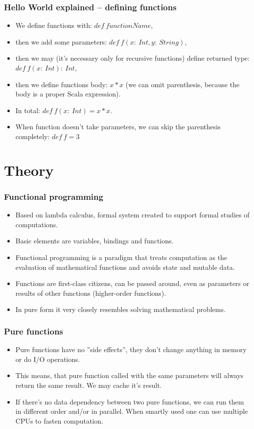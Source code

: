 \documentclass[xcolor=dvipsnames]{beamer}
\begin{document}
\begin{frame}
\frametitle{Hello World explained -- defining functions}
\begin{itemize}
\item We define functions with: $def\:functionName$,
\item then we add some parameters: $def\:f(x:\:Int, y:\:String)$,
\item then we may (it's necessary only for recursive functions) define returned type: $def\:f(x:\:Int):\:Int$,
\item then we define functions body: $x * x$ (we can omit parenthesis, because the body is a proper Scala expression).
\item In total: $def\:f(x:\:Int) = x * x$.
\item When function doesn't take parameters, we can skip the parenthesis completely: $def\:f = 3$
\end{itemize}
\end{frame}


\section{Theory}

\begin{frame}
\frametitle{Functional programming}
\begin{itemize}
\item Based on lambda calculus, formal system created to support formal studies of computations.
\item Basic elements are variables, bindings and functions.
\item Functional programming is a paradigm that treats computation as the evaluation of mathematical functions and avoids state and mutable data.
\item Functions are first-class citizens, can be passed around, even as parameters or results of other functions (higher-order functions).
\item In pure form it very closely resembles solving mathematical problems.
\end{itemize}
\end{frame}

\begin{frame}
\frametitle{Pure functions}
\begin{itemize}
\item Pure functions have no ''side effects'', they don't change anything in memory or do I/O operations.
\item This means, that pure function called with the same parameters will always return the same result. We may cache it's result.
\item If there's no data dependency between two pure functions, we can run them in different order and/or in parallel. When smartly used one can use multiple CPUs to fasten computation.
\end{itemize}
\end{frame}
\end{document}

